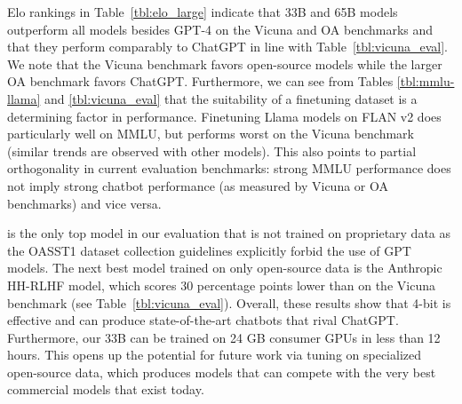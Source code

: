 Elo rankings in Table~\ref{tbl:elo_large} indicate that \model 33B and 65B models outperform all models besides GPT-4 on the Vicuna and OA benchmarks and that they perform comparably to ChatGPT in line with Table~\ref{tbl:vicuna_eval}. We note that the Vicuna benchmark favors open-source models while the larger OA benchmark favors ChatGPT.
Furthermore, we can see from Tables \ref{tbl:mmlu-llama} and \ref{tbl:vicuna_eval} that the suitability of a finetuning dataset is a determining factor in performance. Finetuning Llama models on FLAN v2 does particularly well on MMLU, but performs worst on the Vicuna benchmark (similar trends are observed with other models). This also points to partial orthogonality in current evaluation benchmarks: strong MMLU performance does not imply strong chatbot performance (as measured by Vicuna or OA benchmarks) and vice versa.

\model is the only top model in our evaluation that is not trained on proprietary data as the OASST1 dataset collection guidelines explicitly forbid the use of GPT models. The next best model trained on only open-source data is the Anthropic HH-RLHF model, which scores 30 percentage points lower than \model on the Vicuna benchmark (see Table~\ref{tbl:vicuna_eval}). Overall, these results show that 4-bit \method is effective and can produce state-of-the-art chatbots that rival ChatGPT. Furthermore, our 33B \model can be trained on 24 GB consumer GPUs in less than 12 hours. This opens up the potential for future work via \method tuning on specialized open-source data, which produces models that can compete with the very best commercial models that exist today. 

